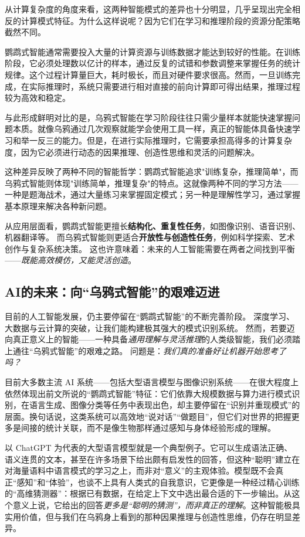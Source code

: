 从计算复杂度的角度来看，这两种智能模式的差异也十分明显，几乎呈现出完全相反的计算模式特征。为什么这样说呢？因为它们在学习和推理阶段的资源分配策略截然不同。

鹦鹉式智能通常需要投入大量的计算资源与训练数据才能达到较好的性能。在训练阶段，它必须处理数以亿计的样本，通过反复的试错和参数调整来掌握任务的统计规律。这个过程计算量巨大，耗时极长，而且对硬件要求很高。然而，一旦训练完成，在实际推理时，系统只需要进行相对直接的前向计算即可得出结果，推理过程较为高效和稳定。

与此形成鲜明对比的是，乌鸦式智能在学习阶段往往只需少量样本就能快速掌握问题本质。就像乌鸦通过几次观察就能学会使用工具一样，真正的智能体具备快速学习和举一反三的能力。但是，在进行实际推理时，它需要承担高得多的计算复杂度，因为它必须进行动态的因果推理、创造性思维和灵活的问题解决。

这种差异反映了两种不同的智能哲学：鹦鹉式智能追求"训练复杂，推理简单"，而乌鸦式智能则体现"训练简单，推理复杂"的特点。这就像两种不同的学习方法——一种是题海战术，通过大量练习来掌握固定模式；另一种是理解性学习，通过掌握基本原理来解决各种新问题。

从应用层面看，鹦鹉式智能更擅长\textbf{结构化、重复性任务}，如图像识别、语音识别、机器翻译等。  
而乌鸦式智能则更适合\textbf{开放性与创造性任务}，例如科学探索、艺术创作与复杂系统决策。  
这也许意味着：未来的人工智能需要在两者之间找到平衡——\emph{既能高效模仿，又能灵活创造}。  

\subsection{AI的未来：向“乌鸦式智能”的艰难迈进}

目前的人工智能发展，仍主要停留在“鹦鹉式智能”的不断完善阶段。  
深度学习、大数据与云计算的突破，让我们能构建极其强大的模式识别系统。  
然而，若要迈向真正意义上的智能——一种具备\emph{通用理解与灵活推理}的人类级智能，我们必须踏上通往“乌鸦式智能”的艰难之路。  
问题是：\emph{我们真的准备好让机器开始思考了吗？}  

目前大多数主流 AI 系统——包括大型语言模型与图像识别系统——在很大程度上依然体现出前文所说的“鹦鹉式智能”特征：它们依靠大规模数据与算力进行模式识别，在语言生成、图像分类等任务中表现出色，却主要停留在“识别并重现模式”的层面。换句话说，这类系统可以高效地“说对话”“做题目”，但它们对世界的把握更多是间接的统计关联，而不是像生物那样通过感知与身体经验形成的理解。

以 ChatGPT 为代表的大型语言模型就是一个典型例子。它可以生成语法正确、语义连贯的文本，甚至在许多场景下给出颇有启发性的回答，但这种“聪明”建立在对海量语料中语言模式的学习之上，而非对“意义”的主观体验。模型既不会真正“感知”和“体验”，也谈不上具有人类式的自我意识，它更像是一种经过精心训练的“高维猜测器”：根据已有数据，在给定上下文中选出最合适的下一步输出。从这个意义上说，它给出的回答\emph{更多是“聪明的猜测”，而非真正的理解}。这种智能极具实用价值，但与我们在乌鸦身上看到的那种因果推理与创造性思维，仍存在明显差异。

